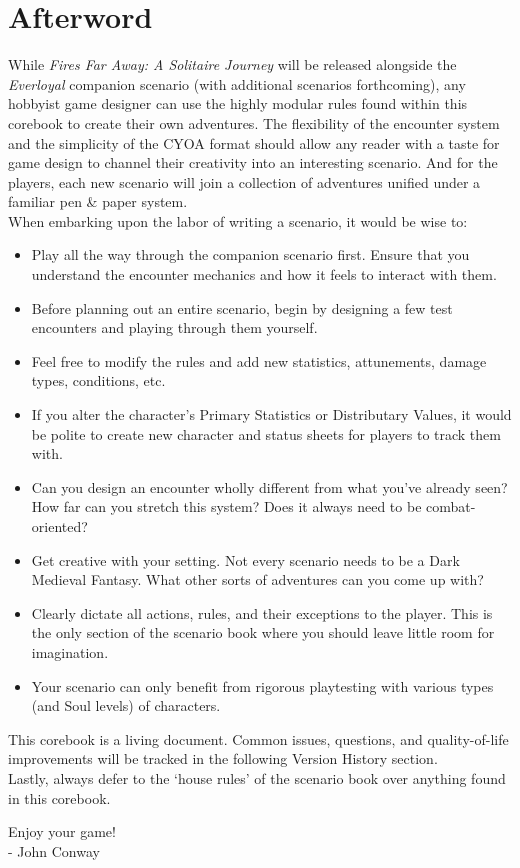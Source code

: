 \documentclass[12pt]{article}
\begin{document}
\section{Afterword}
\begin{multicols*}{2}
\setlength{\parindent}{0pt}
While \emph{Fires Far Away: A Solitaire Journey} will be released alongside the \emph{Everloyal} companion scenario (with additional scenarios forthcoming), any hobbyist game designer can use the highly modular rules found within this corebook to create their own adventures. The flexibility of the encounter system and the simplicity of the CYOA format should allow any reader with a taste for game design to channel their creativity into an interesting scenario. And for the players, each new scenario will join a collection of adventures unified under a familiar pen \& paper system.\\
When embarking upon the labor of writing a scenario, it would be wise to:
\begin{itemize}
\item Play all the way through the companion scenario first. Ensure that you understand the encounter mechanics and how it feels to interact with them.
\item Before planning out an entire scenario, begin by designing a few test encounters and playing through them yourself.
\item Feel free to modify the rules and add new statistics, attunements, damage types, conditions, etc.
\item If you alter the character’s Primary Statistics or Distributary Values, it would be polite to create new character and status sheets for players to track them with.
\item Can you design an encounter wholly different from what you’ve already seen? How far can you stretch this system? Does it always need to be combat-oriented?
\item Get creative with your setting. Not every scenario needs to be a Dark Medieval Fantasy. What other sorts of adventures can you come up with?
\item Clearly dictate all actions, rules, and their exceptions to the player. This is the only section of the scenario book where you should leave little room for imagination.
\item Your scenario can only benefit from rigorous playtesting with various types (and Soul levels) of characters.
\end{itemize}

This corebook is a living document. Common issues, questions, and quality-of-life improvements will be tracked in the following Version History section.\\
Lastly, always defer to the ‘house rules’ of the scenario book over anything found in this corebook.\\
\begin{flushright}
Enjoy your game!\\
- John Conway
\end{flushright}


\end{multicols*}
\end{document}
